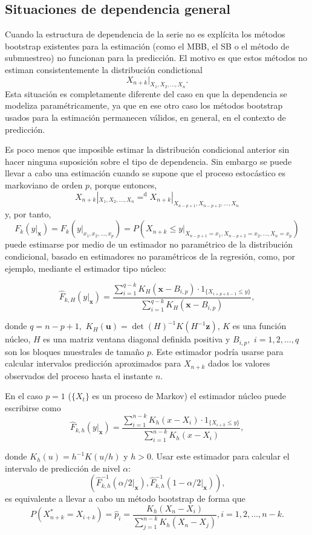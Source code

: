 \documentclass[
]{book}
\renewcommand{\mathbf}[1]{\symbf{#1}}
\theoremstyle{break}
\theoremstyle{nonumberplain}
\begin{document}
\subsection{Situaciones de dependencia general}\label{situaciones-de-dependencia-general-2}

Cuando la estructura de dependencia de la serie no es explícita los
métodos bootstrap existentes para la estimación (como el MBB, el SB o el
método de submuestreo) no funcionan para la predicción. El motivo es que
estos métodos no estiman consistentemente la distribución condictional
\[X_{n+k}|_{X_1,X_2,\ldots ,X_n}.\]
Esta situación es
completamente diferente del caso en que la dependencia se modeliza
paramétricamente, ya que en ese otro caso los métodos bootstrap usados
para la estimación permanecen válidos, en general, en el contexto de
predicción.

Es poco menos que imposible estimar la distribución condicional anterior
sin hacer ninguna suposición sobre el tipo de dependencia. Sin embargo
se puede llevar a cabo una estimación cuando se supone que el proceso
estocástico es markoviano de orden \(p\), porque entonces,
\[X_{n+k}|_{X_1,X_2,\ldots ,X_n}{=}^{\mathrm{d}
}X_{n+k}|_{X_{n-p+1},X_{n-p+2},\ldots ,X_n}\]
y, por tanto,
\[F_{k}(y|_{\mathbf{x}})=F_{k}(y|_{x_1,x_2,\ldots ,x_{p}})=P\left(
X_{n+k}\leq y|_{X_{n-p+1}=x_1,X_{n-p+2}=x_2,\ldots ,X_n=x_{p}} \right)\]
puede estimarse por medio de un estimador no paramétrico de la distribución
condicional, basado en estimadores no paramétricos de la regresión,
como, por ejemplo, mediante el estimador tipo núcleo:

\[\widehat{F}_{k,H}(y|_{\mathbf{x}})=\frac{\sum_{i=1}^{q-k}K_{H}(\mathbf{x}
-B_{i,p})\cdot 1_{\{X_{i+p+k-1}\leq y\}}}{\sum_{i=1}^{q-k}K_{H}(\mathbf{x}
-B_{i,p})},\]

donde \(q=n-p+1,\) \(K_{H}(\mathbf{u})=\det (H)^{-1}K(H^{-1}\mathbf{z})\), \(K\) es
una función núcleo, \(H\) es una matriz ventana diagonal definida positiva
y \(B_{i,p},\) \(i=1,2,\ldots ,q\) son los bloques muestrales de tamaño \(p\).
Este estimador podría usarse para calcular intervalos predicción
aproximados para \(X_{n+k}\) dados los valores observados del proceso
hasta el instante \(n\).

En el caso \(p=1\) (\(\{X_{t}\}\) es un proceso de Markov) el estimador
núcleo puede escribirse como
\[\widehat{F}_{k,h}(y|_{\mathbf{x}})=\frac{\sum_{i=1}^{n-k}K_{h}(x-X_i)\cdot
1_{\{X_{i+k}\leq y\}}}{\sum_{i=1}^{n-k}K_{h}(x-X_i)},\]

donde \(K_{h}(u)=h^{-1}K(u/h)\) y \(h>0\). Usar este estimador para calcular
el intervalo de predicción de nivel \(\alpha\):
\[\left( \widehat{F}
_{k,h}^{-1}(\alpha /2|_{\mathbf{x}}),\widehat{F}_{k,h}^{-1}(1-\alpha /2|_{\mathbf{x}}) \right),\]
es equivalente a llevar a cabo un método bootstrap de forma que
\[P\left( X_{n+k}^{\ast}=X_{i+k} \right) =\widehat{p}_i=\frac{
K_{h}(X_n-X_i)}{\sum_{j=1}^{n-k}K_{h}(X_n-X_j)}\mathrm{,}
i=1,2,\ldots ,n-k.\]
\end{document}
